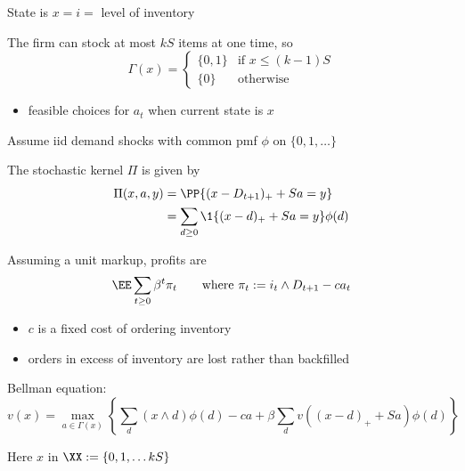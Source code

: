 \begin{frame}

    State is $x = i = $ level of inventory
    
    \vspace{1.0em}
    The firm can stock at most $kS$ items at one time, so
    \begin{equation*}
        \Gamma(x) = 
        \begin{cases}
            \{0, 1\} & \text{if } x \leq (k-1)S
            \\
            \{0\} & \text{otherwise } 
        \end{cases}
    \end{equation*}
    \vspace{-1.0em}
    \begin{itemize}
        \item feasible choices for $a_t$ when current state is $x$
    \end{itemize}

    \vspace{0.5em}
    Assume {\sc iid} demand shocks with common {\sc pmf} $\phi$
    on $\{0, 1, \ldots\}$

    \vspace{0.5em}
    The stochastic kernel $\Pi$ is given by 
    \begin{align*}
        \Pi(x, a, y) 
        & = \PP \{ (x - D_{t+1})_+ + S a = y \}
        \\
        & = \sum_{d \geq 0} \1 \{ (x - d)_+ + S a = y \} \phi(d)
    \end{align*}


\end{frame}

\begin{frame}
    
    Assuming a unit markup, profits are
    \begin{equation*}
        \EE \sum_{t \geq 0} \beta^t \pi_t
        \qquad \text{where } \pi_t := i_t \wedge D_{t+1} - c a_t
    \end{equation*}

    \begin{itemize}
        \item $c$ is a fixed cost of ordering inventory  
        \item orders in excess of inventory are lost rather than backfilled
    \end{itemize}


        \vspace{0.5em}
    Bellman equation:
    \begin{equation*}
        v(x)
        = \max_{a \in \Gamma(x)} \left\{
            \sum_{d } (x \wedge d) \phi(d)
            - c a
            + \beta
            \sum_{d } v((x - d)_+ + Sa) \phi(d)
        \right\}
    \end{equation*}

        \vspace{0.5em}
    Here $x$ in $\XX := \{0, 1, \ldots kS \}$
    
    
\end{frame}




